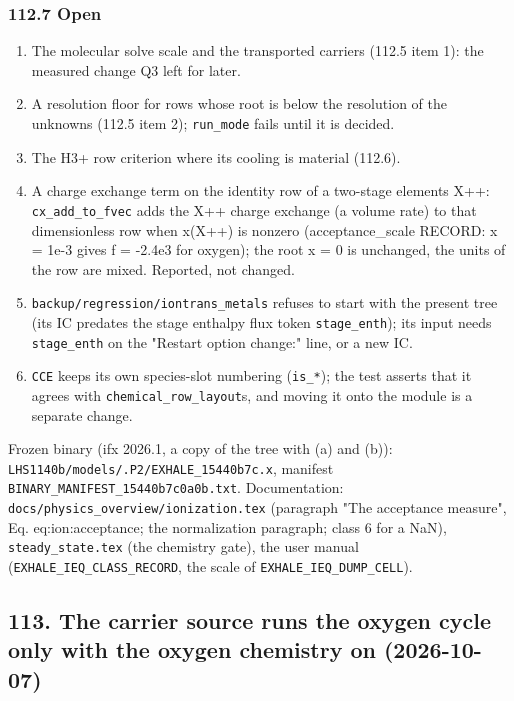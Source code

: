 \documentclass[english,a4paper]{my_memo}
\providecommand{\tightlist}{\setlength{\itemsep}{0pt}\setlength{\parskip}{0pt}}
\begin{document}
\subsubsection{112.7 Open}\label{1127-open}

\begin{enumerate}
\def\labelenumi{\arabic{enumi}.}
\tightlist
\item
  The molecular solve scale and the transported carriers (112.5 item 1): the
  measured change Q3 left for later.
\item
  A resolution floor for rows whose root is below the resolution of the
  unknowns (112.5 item 2); \texttt{run\_mode} fails until it is decided.
\item
  The H3+ row criterion where its cooling is material (112.6).
\item
  A charge exchange term on the identity row of a two-stage element\textquotesingle s X++:
  \texttt{cx\_add\_to\_fvec} adds the X++ charge exchange (a volume rate) to that
  dimensionless row when x(X++) is nonzero (acceptance\_scale RECORD: x = 1e-3
  gives f = -2.4e3 for oxygen); the root x = 0 is unchanged, the units of
  the row are mixed. Reported, not changed.
\item
  \texttt{backup/regression/iontrans\_metals} refuses to start with the present tree
  (its IC predates the stage enthalpy flux token \texttt{stage\_enth}); its input
  needs \texttt{stage\_enth} on the "Restart option change:" line, or a new IC.
\item
  \texttt{CCE} keeps its own species-slot numbering (\texttt{is\_*}); the test asserts
  that it agrees with \texttt{chemical\_row\_layout}\textquotesingle s, and moving it onto the module
  is a separate change.
\end{enumerate}

Frozen binary (ifx 2026.1, a copy of the tree with (a) and (b)):
\texttt{LHS1140b/models/.P2/EXHALE\_15440b7c.x}, manifest
\texttt{BINARY\_MANIFEST\_15440b7c0a0b.txt}. Documentation:
\texttt{docs/physics\_overview/ionization.tex} (paragraph "The acceptance measure",
Eq. eq:ion:acceptance; the normalization paragraph; class 6 for a NaN),
\texttt{steady\_state.tex} (the chemistry gate), the user manual
(\texttt{EXHALE\_IEQ\_CLASS\_RECORD}, the scale of \texttt{EXHALE\_IEQ\_DUMP\_CELL}).

\subsection{113. The carrier source runs the oxygen cycle only with the oxygen chemistry on (2026-10-07)}\label{113-the-carrier-source-runs-the-oxygen-cycle-only-with-the-oxygen-chemistry-on-2026-10-07}
\end{document}
